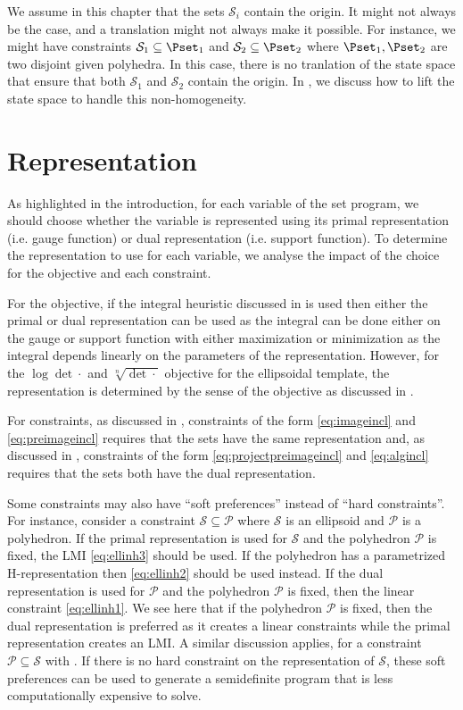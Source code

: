 \documentclass[11pt,twoside,a4paper,openright]{uclouvain-thesis}
\begin{document}
We assume in this chapter that the sets $\mathcal{S}_i$ contain the origin.
It might not always be the case, and a translation might not always make it possible.
For instance, we might have constraints $\mathcal{S}_1 \subseteq \Pset_1$ and
$\mathcal{S}_2 \subseteq \Pset_2$ where $\Pset_1, \Pset_2$ are two disjoint given polyhedra.
In this case, there is no tranlation of the state space that ensure that
both $\mathcal{S}_1$ and $\mathcal{S}_2$ contain the origin.
In , we discuss how to lift the state space to handle this non-homogeneity.

\section{Representation}
\label{sec:representation}
As highlighted in the introduction, for each variable of the set program,
we should choose whether the variable is represented using its primal representation (i.e. gauge function) or dual representation (i.e. support function).
To determine the representation to use for each variable, we analyse the impact
of the choice for the objective and each constraint.

For the objective, if the integral heuristic discussed in  is used
then either the primal or dual representation can be used as
the integral can be done either on the gauge or support function with either
maximization or minimization as the integral depends linearly on the parameters
of the representation.
However, for the $\log \det \cdot$ and $\sqrt[n]{\det \cdot}$ objective for
the ellipsoidal template, the representation is determined by the sense
of the objective as discussed in .

For constraints,
as discussed in ,
constraints of the form
\eqref{eq:imageincl} and \eqref{eq:preimageincl} requires that the sets have
the same representation and,
as discussed in ,
constraints of the form
\eqref{eq:projectpreimageincl} and \eqref{eq:algincl} requires that the sets both
have the dual representation.

Some constraints may also have ``soft preferences'' instead of ``hard constraints''.
For instance, consider a constraint $\mathcal{S} \subseteq \mathcal{P}$
where $\mathcal{S}$ is an ellipsoid and $\mathcal{P}$ is a polyhedron.
If the primal representation is used for $\mathcal{S}$ and the polyhedron $\mathcal{P}$
is fixed,
the LMI \eqref{eq:ellinh3} should be used.
If the polyhedron has a parametrized H-representation then \eqref{eq:ellinh2}
should be used instead.
If the dual representation is used for $\mathcal{P}$ and the polyhedron $\mathcal{P}$
is fixed, then the linear constraint \eqref{eq:ellinh1}.
We see here that if the polyhedron $\mathcal{P}$ is fixed,
then the dual representation is preferred as it creates a linear constraints
while the primal representation creates an LMI.
A similar discussion applies, for a constraint $\mathcal{P} \subseteq \mathcal{S}$
with .
If there is no hard constraint on the representation of $\mathcal{S}$,
these soft preferences can be used to generate a semidefinite program that
is less computationally expensive to solve.
\end{document}
